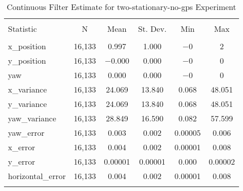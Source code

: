 
\begin{table}[h] \centering 
  \caption{Continuous Filter Estimate for two-stationary-no-gps Experiment} 
  \label{tab:two_stationary_no_gps_continuous_summary} 
\begin{tabular}{@{\extracolsep{5pt}}lccccc} 
\\[-1.8ex]\hline 
\hline \\[-1.8ex] 
Statistic & \multicolumn{1}{c}{N} & \multicolumn{1}{c}{Mean} & \multicolumn{1}{c}{St. Dev.} & \multicolumn{1}{c}{Min} & \multicolumn{1}{c}{Max} \\ 
\hline \\[-1.8ex] 
x\_position & 16,133 & \num{0.997} & \num{1.000} & $-$0 & 2 \\ 
y\_position & 16,133 & $-$0.000 & \num{0.000} & $-$0 & 0 \\ 
yaw & 16,133 & \num{0.000} & \num{0.000} & $-$0 & 0 \\ 
x\_variance & 16,133 & \num{24.069} & \num{13.840} & \num{0.068} & \num{48.051} \\ 
y\_variance & 16,133 & \num{24.069} & \num{13.840} & \num{0.068} & \num{48.051} \\ 
yaw\_variance & 16,133 & \num{28.849} & \num{16.590} & \num{0.082} & \num{57.599} \\ 
yaw\_error & 16,133 & \num{0.003} & \num{0.002} & \num{0.00005} & \num{0.006} \\ 
x\_error & 16,133 & \num{0.004} & \num{0.002} & \num{0.00001} & \num{0.008} \\ 
y\_error & 16,133 & \num{0.00001} & \num{0.00001} & \num{0.000} & \num{0.00002} \\ 
horizontal\_error & 16,133 & \num{0.004} & \num{0.002} & \num{0.00001} & \num{0.008} \\ 
\hline \\[-1.8ex] 
\end{tabular} 
\end{table} 

